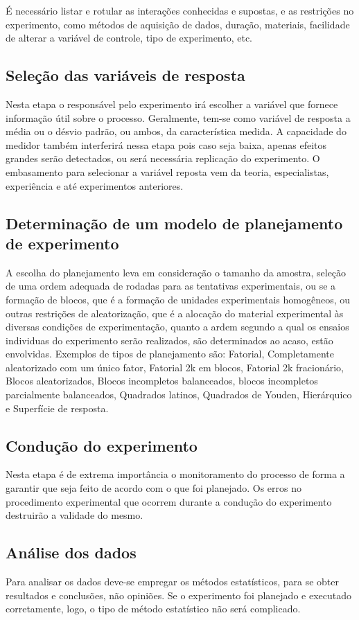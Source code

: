 É necessário listar e rotular as interações conhecidas e supostas, e as restrições no experimento, como métodos de aquisição de dados, duração, materiais, facilidade de alterar a variável de controle, tipo de experimento, etc.


\subsection{Seleção das variáveis de resposta}
Nesta etapa o responsável pelo experimento irá escolher a variável que fornece informação útil sobre o processo. Geralmente, tem-se como variável de resposta a média ou o désvio padrão, ou ambos, da característica medida.
A capacidade do medidor também interferirá nessa etapa pois caso seja baixa, apenas efeitos grandes serão detectados, ou será necessária replicação do experimento. O embasamento para selecionar a variável reposta vem da teoria, especialistas, experiência e até experimentos anteriores.

\subsection{Determinação de um modelo de planejamento de experimento}
A escolha do planejamento leva em consideração o tamanho da amostra, seleção de uma ordem adequada de rodadas para as tentativas experimentais, ou se a formação de blocos, que é a formação de unidades experimentais homogêneos, ou outras restrições de aleatorização,  que é a alocação do material
experimental às diversas condições de experimentação, quanto a ardem segundo a qual os ensaios individuas do experimento serão realizados, são determinados ao acaso, estão envolvidas. Exemplos de tipos de planejamento são: Fatorial, Completamente aleatorizado com um único fator, Fatorial 2k em blocos, Fatorial 2k fracionário, Blocos aleatorizados, Blocos incompletos balanceados, blocos incompletos parcialmente balanceados, Quadrados latinos, Quadrados de Youden, Hierárquico e Superfície de resposta.


\subsection{Condução do experimento}
Nesta etapa é de extrema importância o monitoramento do processo de forma a garantir que seja feito de acordo com o que foi planejado. Os erros no procedimento experimental que ocorrem durante a condução do experimento destruirão a validade do mesmo. 

\subsection{Análise dos dados}
Para analisar os dados deve-se empregar os métodos estatísticos, para se obter resultados e conclusões, não opiniões. Se o experimento foi planejado e executado corretamente, logo, o tipo de método estatístico não será complicado. 

